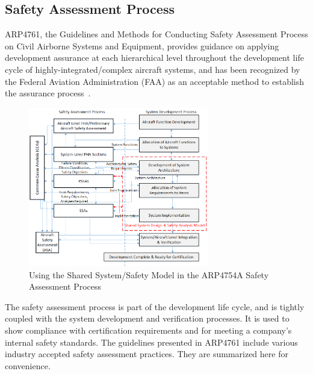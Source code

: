 \subsection{Safety Assessment Process}
\label{subsec:process}

ARP4761, the Guidelines and Methods for Conducting Safety Assessment Process on Civil Airborne Systems and Equipment, provides guidance on applying development assurance at each hierarchical level throughout the development life cycle of highly-integrated/complex aircraft systems, and has been recognized by the Federal Aviation Administration (FAA) as an acceptable method to establish the assurance process~\cite{SAE:ARP4761}.

\begin{figure}[h!]
	\centering
	\includegraphics[width=0.7\textwidth]{images/Safety_Assessment_Process.png}
	\caption{Using the Shared System/Safety Model in the ARP4754A Safety Assessment Process}
	\label{fig:proposed_safety_process}
\end{figure}

The safety assessment process is part of the development life cycle, and is tightly coupled with the system development and verification processes. It is used to show compliance with certification requirements and for meeting a company's internal safety standards. The guidelines presented in ARP4761 include various industry accepted safety assessment practices. They are summarized here for convenience. 

